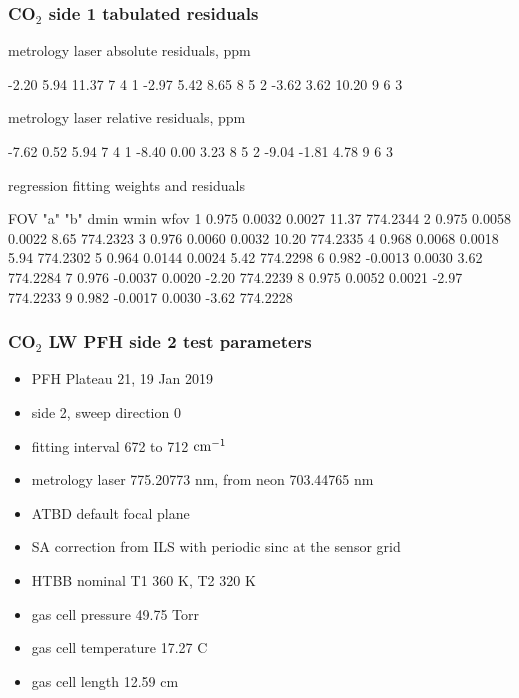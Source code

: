 \documentclass[10pt]{beamer}
\begin{document}
\begin{frame}[fragile]
\frametitle{CO$_2$ side 1 tabulated residuals}

  metrology laser absolute residuals, ppm
\begin{semiverbatim}\scriptsize
     -2.20     5.94    11.37         7   4   1
     -2.97     5.42     8.65         8   5   2
     -3.62     3.62    10.20         9   6   3
\end{semiverbatim}

  metrology laser relative residuals, ppm
\begin{semiverbatim}\scriptsize
     -7.62     0.52     5.94         7   4   1
     -8.40     0.00     3.23         8   5   2
     -9.04    -1.81     4.78         9   6   3
\end{semiverbatim}

     regression fitting weights and residuals
\begin{semiverbatim}\scriptsize
 FOV   "a"       "b"     dmin     wmin      wfov
  1   0.975    0.0032   0.0027    11.37   774.2344 
  2   0.975    0.0058   0.0022     8.65   774.2323 
  3   0.976    0.0060   0.0032    10.20   774.2335 
  4   0.968    0.0068   0.0018     5.94   774.2302 
  5   0.964    0.0144   0.0024     5.42   774.2298 
  6   0.982   -0.0013   0.0030     3.62   774.2284 
  7   0.976   -0.0037   0.0020    -2.20   774.2239 
  8   0.975    0.0052   0.0021    -2.97   774.2233 
  9   0.982   -0.0017   0.0030    -3.62   774.2228 
\end{semiverbatim}

\end{frame}
\begin{frame}
\frametitle{CO$_2$ LW PFH side 2 test parameters}

\begin{itemize}
  \item PFH Plateau 21, 19 Jan 2019
  \item side 2, sweep direction 0
  \item fitting interval 672 to 712 $\mbox{cm$^{-1}$}$
  \item metrology laser 775.20773 nm, from neon 703.44765 nm
  \item ATBD default focal plane
  \item SA correction from ILS with periodic sinc at the sensor grid
  \item HTBB nominal T1 360 K, T2 320 K
  \item gas cell pressure 49.75 Torr
  \item gas cell temperature 17.27 C
  \item gas cell length 12.59 cm
\end{itemize}

\end{frame}
\end{document}
